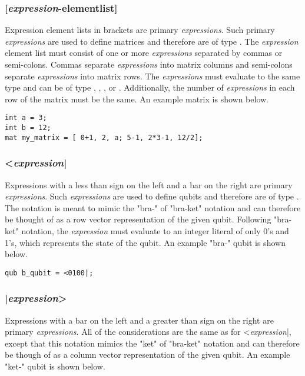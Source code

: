 \subsubsection{[\textit{expression}-elementlist]}
Expression element lists in brackets are primary \textit{expressions}. Such primary \textit{expressions} are used to define matrices and therefore are of type \mat. The \textit{expression} element list must consist of one or more \textit{expressions} separated by commas or semi-colons. Commas separate \textit{expressions} into matrix columns and semi-colons separate \textit{expressions} into matrix rows. The \textit{expressions} must evaluate to the same type and can be of type \integ, \float, \complex, or \mat. Additionally, the number of \textit{expressions} in each row of the matrix must be the same. An example matrix is shown below.

\begin{verbatim}
int a = 3;
int b = 12;
mat my_matrix = [ 0+1, 2, a; 5-1, 2*3-1, 12/2];
\end{verbatim}

\subsubsection{<\textit{expression}|}
Expressions with a less than sign on the left and a bar on the right are primary \textit{expressions}. Such \textit{expressions} are used to define qubits and therefore are of type \qubit. The notation is meant to mimic the "bra-" of "bra-ket" notation and can therefore be thought of as a row vector representation of the given qubit. Following "bra-ket" notation, the \textit{expression} must evaluate  to an integer literal of only 0's and 1's, which represents the state of the qubit. An example "bra-" qubit is shown below.

\begin{verbatim}
qub b_qubit = <0100|;
\end{verbatim}

\subsubsection{|\textit{expression}>}
Expressions with a bar on the left and a greater than sign on the right are primary \textit{expressions}. All of the considerations are the same as for <\textit{expression}|, except that this notation mimics the "ket" of "bra-ket" notation and can therefore be though of as a column vector representation of the given qubit. An example "ket-" qubit is shown below.

